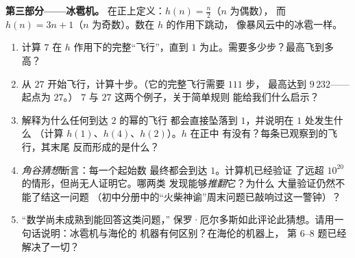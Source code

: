 \begin{problem}
\medskip
\noindent\textbf{第三部分——冰雹机。}
在正上定义：$h(n) = \frac n2$（$n$ 为偶数），
而 $h(n) = 3n + 1$（$n$ 为奇数）。数在 $h$ 的作用下跳动，
像暴风云中的冰雹一样。
\begin{enumerate}[resume]
  \item 计算 $7$ 在 $h$ 作用下的完整“飞行”，直到
        $1$ 为止。需要多少步？最高飞到多高？
  \item 从 $27$ 开始飞行，计算十步。（它的完整飞行需要 $111$ 步，
        最高达到 $9\,232$——起点为 $27$。）
        $7$ 与 $27$ 这两个例子，关于简单规则
        能给我们什么启示？
  \item 解释为什么任何到达 $2$ 的幂的飞行
        都会直接坠落到 $1$，并说明在 $1$ 处发生什么
        （计算 $h(1)$、$h(4)$、$h(2)$）。$h$ 在正中
        有没有？每条已观察到的飞行，其末尾
        反而形成的是什么？
  \item \emph{角谷猜想}断言：每一个起始数
        最终都会到达 $1$。计算机已经验证
        了远超 $10^{20}$ 的情形，但尚无人证明它。哪两类
        发现能够\emph{推翻}它？为什么
        大量验证仍然不能了结这一问题
        （初中分册中的“火柴神谕”周末问题已敲响过这一警钟）？
  \item “数学尚未成熟到能回答这类问题，”
        保罗·厄尔多斯如此评论此猜想。请用一句话说明：冰雹机与海伦的
        机器有何区别？在海伦的机器上，
        第 6--8 题已经解决了一切？
\end{enumerate}


\end{problem}
